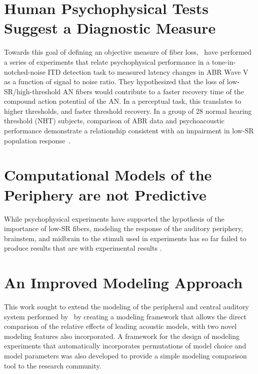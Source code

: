 \section{Human Psychophysical Tests Suggest a Diagnostic Measure}
Towards this goal of defining an objective measure of fiber loss,~\cite{Mehraei2015Individual,Mehraei2016Auditory} have performed a series of experiments that relate psychophysical performance in a tone-in-notched-noise ITD detection task to measured latency changes in ABR Wave V as a function of signal to noise ratio.  They hypothesized that the loss of low-SR/high-threshold AN fibers would contribute to a faster recovery time of the compound action potential of the AN.  In a perceptual task, this translates to higher thresholds, and faster threshold recovery. In a group of 28 normal hearing threshold (NHT) subjects, comparison of ABR data and psychoacoustic performance demonstrate a relationship consistent with an impairment in low-SR population response~\cite{Mehraei2016Auditory}.

\section{Computational Models of the Periphery are not Predictive}

While psychophysical experiments have supported the hypothesis of the importance of low-SR fibers, modeling the response of the auditory periphery, brainstem, and midbrain to the stimuli used in experiments has so far failed to produce results that are with experimental results \citep{Mehraei2016Auditory}.

\section{An Improved Modeling Approach} %
\label{sec:an_improved_modeling_approach}
This work sought to extend the modeling of the peripheral and central auditory system performed by~\cite{Mehraei2015Auditory} by creating a modeling framework that allows the direct comparison of the relative effects of leading acoustic models, with two novel modeling features also incorporated.  A framework for the design of modeling experiments that automatically incorporates permutations of model choice and model parameters was also developed to provide a simple modeling comparison tool to the research community. 


